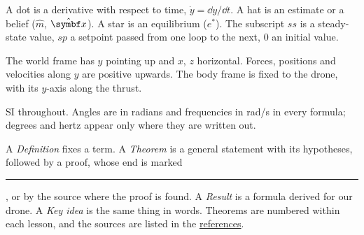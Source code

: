\begin{description}[leftmargin=0pt, itemsep=1pt, topsep=2pt, font=\sffamily\small\bfseries]
  \item[Marks.] A dot is a derivative with respect to time, $\dot y = \dd y/\dd t$. A hat is an estimate or a belief ($\hat m$, $\hat{\vx}$). A star is an equilibrium ($e^*$). The subscript $ss$ is a steady-state value, $sp$ a setpoint passed from one loop to the next, $0$ an initial value.
  \item[Frames and signs.] The world frame has $y$ pointing up and $x$, $z$ horizontal. Forces, positions and velocities along $y$ are positive upwards. The body frame is fixed to the drone, with its $y$-axis along the thrust.
  \item[Units.] SI throughout. Angles are in radians and frequencies in \si{rad/s} in every formula; degrees and hertz appear only where they are written out.
  \item[Statements.] A \emph{Definition} fixes a term. A \emph{Theorem} is a general statement with its hypotheses, followed by a proof, whose end is marked \rule{0.45em}{0.45em}, or by the source where the proof is found. A \emph{Result} is a formula derived for our drone. A \emph{Key idea} is the same thing in words. Theorems are numbered within each lesson, and the sources are listed in the \hyperref[app:refs]{references}.
\end{description}
